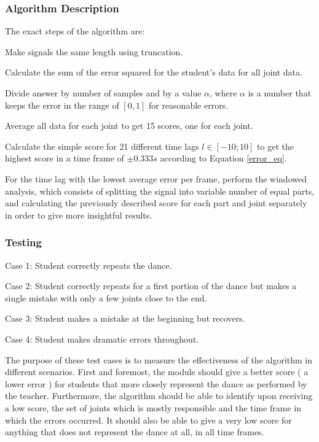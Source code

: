 \documentclass[10pt,a4paper]{article}
\begin{document}
\subsubsection{Algorithm Description}
\noindent
 The exact steps of the algorithm are:
\begin{compactitem}
\setlength{\itemsep}{1pt}
\setlength{\parskip}{0pt}
\setlength{\parsep}{0pt}
	\item Make signals the same length using truncation.
	\item Calculate the sum of the error squared for the student's data for all joint data.
	\item Divide answer by number of samples and by a value $\alpha$, where $\alpha$ is a number that keeps the error in the range of $[0, 1]$ for reasonable errors. 
	\item Average all data for each joint to get 15 scores, one for each joint.
	\item Calculate the simple score for 21 different time lags $l \in [-10;10]$ to get the highest score in a time frame of $\pm 0.333s$
 according to Equation \eqref{error_eq}.
	\item For the time lag with the lowest average error per frame, perform the windowed analysis, which consists of splitting the signal into variable number of equal parts, and calculating the previously described score for each part and joint separately in order to give more insightful results. 
\end{compactitem}
\subsubsection{Testing}
\begin{compactitem}
\item{Case 1: Student correctly repeats the dance.}
\item{Case 2: Student correctly repeats for a first portion of the dance but makes a single mistake with only a few joints close to the end.}
\item{Case 3: Student makes a mistake at the beginning but recovers.}
\item{Case 4: Student makes dramatic errors throughout.}
\end{compactitem}

\noindent
The purpose of these test cases is to measure the effectiveness of the algorithm in different scenarios. First and foremost, the module should give a better score ( a lower error ) for students that more closely represent the dance as performed by the teacher. Furthermore, the algorithm should be able to identify upon receiving a low score,  the set of joints which is mostly responsible and the time frame in which the errors occurred. It should also be able to give a very low score for anything that does not represent the dance at all, in all time frames.
\end{document}
